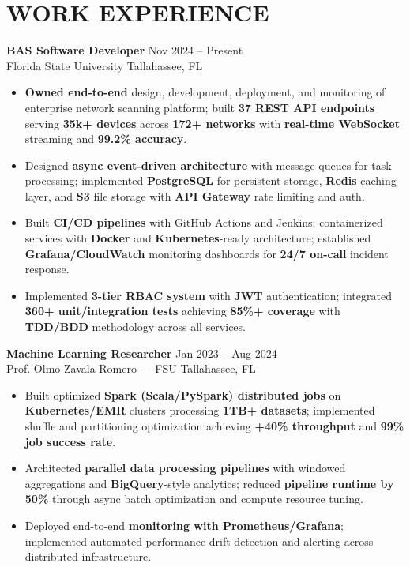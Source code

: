 \documentclass[letterpaper,10pt]{article}
\newcommand{\resumeItem}[1]{\item\small #1}
\newcommand{\resumeSubheading}[4]{
  \vspace{6pt}
  \noindent
  \textbf{#1} \hfill {\footnotesize #2} \\
  [-1pt]
  \noindent
  \small #3 \hfill {\small #4}
  \vspace{3pt}
}
\newcommand{\resumeItemsStart}{\vspace{-2pt}\begin{itemize}}
\newcommand{\resumeItemsEnd}{\end{itemize}\vspace{6pt}}
\begin{document}
\section{\textcolor{metablue}{WORK EXPERIENCE}}
\vspace{-12pt}

\resumeSubheading
{BAS Software Developer}{Nov 2024 -- Present}
{Florida State University}{Tallahassee, FL}
\resumeItemsStart
\resumeItem{\textbf{Owned end-to-end} design, development, deployment, and monitoring of enterprise network scanning platform; built \textbf{37 REST API endpoints} serving \textbf{35k+ devices} across \textbf{172+ networks} with \textbf{real-time WebSocket} streaming and \textbf{99.2\% accuracy}.}
\resumeItem{Designed \textbf{async event-driven architecture} with message queues for task processing; implemented \textbf{PostgreSQL} for persistent storage, \textbf{Redis} caching layer, and \textbf{S3} file storage with \textbf{API Gateway} rate limiting and auth.}
\resumeItem{Built \textbf{CI/CD pipelines} with GitHub Actions and Jenkins; containerized services with \textbf{Docker} and \textbf{Kubernetes}-ready architecture; established \textbf{Grafana/CloudWatch} monitoring dashboards for \textbf{24/7 on-call} incident response.}
\resumeItem{Implemented \textbf{3-tier RBAC system} with \textbf{JWT} authentication; integrated \textbf{360+ unit/integration tests} achieving \textbf{85\%+ coverage} with \textbf{TDD/BDD} methodology across all services.}
\resumeItemsEnd
\vspace{-12pt}

\resumeSubheading
{Machine Learning Researcher}{Jan 2023 -- Aug 2024}
{Prof. Olmo Zavala Romero — FSU}{Tallahassee, FL}
\resumeItemsStart
\resumeItem{Built optimized \textbf{Spark (Scala/PySpark) distributed jobs} on \textbf{Kubernetes/EMR} clusters processing \textbf{1TB+ datasets}; implemented shuffle and partitioning optimization achieving \textbf{+40\% throughput} and \textbf{99\% job success rate}.}
\resumeItem{Architected \textbf{parallel data processing pipelines} with windowed aggregations and \textbf{BigQuery}-style analytics; reduced \textbf{pipeline runtime by 50\%} through async batch optimization and compute resource tuning.}
\resumeItem{Deployed end-to-end \textbf{monitoring with Prometheus/Grafana}; implemented automated performance drift detection and alerting across distributed infrastructure.}
\resumeItemsEnd
\vspace{-12pt}
\end{document}
